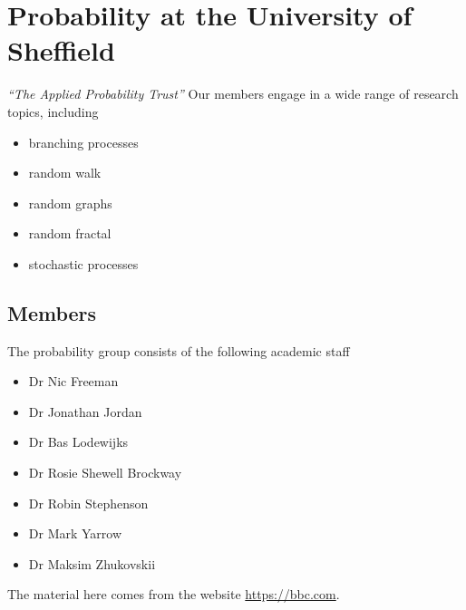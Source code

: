 \documentclass[11pt, a4paper]{amsart}
\begin{document}
 

\section{Probability at the University of Sheffield}

\emph{``The Applied Probability Trust''}
Our members engage in a wide range of research topics, 
including
\begin{itemize}
	\item branching processes
	\item random walk
	\item random graphs
	\item random fractal
	\item stochastic processes
\end{itemize}

\subsection{Members}
The probability group consists of the following academic staff
\begin{itemize}
	\item Dr Nic Freeman
	\item Dr Jonathan Jordan
	\item Dr Bas Lodewijks
	\item Dr Rosie Shewell Brockway
	\item Dr Robin Stephenson
	\item Dr Mark Yarrow
	\item Dr Maksim Zhukovskii
\end{itemize}

The material here comes from the website \url{https://bbc.com}.
\end{document}
